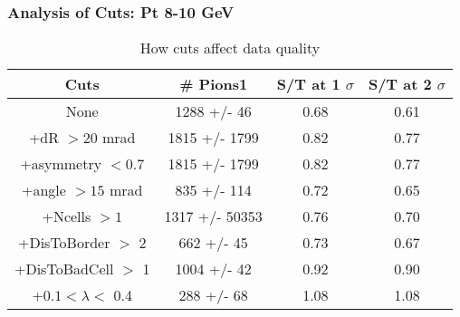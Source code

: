 \frame
{
\frametitle{Analysis of Cuts: Pt  8-10 GeV}
\begin{table}
\caption{How cuts affect data quality}
\centering
\begin{tabular}{c c c c}
\hline\hline
Cuts & \# Pions1 & S/T at 1 $\sigma$ & S/T at 2 $\sigma$ \\ [0.5ex]
\hline
None & 1288 +/-   46 & 0.68 & 0.61 \\ %
+dR $> 20$ mrad & 1815 +/- 1799 & 0.82 & 0.77 \\ %
+asymmetry $< 0.7$ & 1815 +/- 1799 & 0.82 & 0.77 \\ %
+angle $> 15$ mrad &  835 +/-  114 & 0.72 & 0.65 \\ %
+Ncells $> 1$& 1317 +/- 50353 & 0.76 & 0.70 \\ %
+DisToBorder $>$ 2 &  662 +/-   45 & 0.73 & 0.67 \\ %
+DisToBadCell $>$ 1& 1004 +/-   42 & 0.92 & 0.90 \\ %
+$0.1 < \lambda <$ 0.4 &  288 +/-   68 & 1.08 & 1.08 \\ %
[1ex]
\hline
\end{tabular}
\label{table:nonlin}
\end{table}
}

